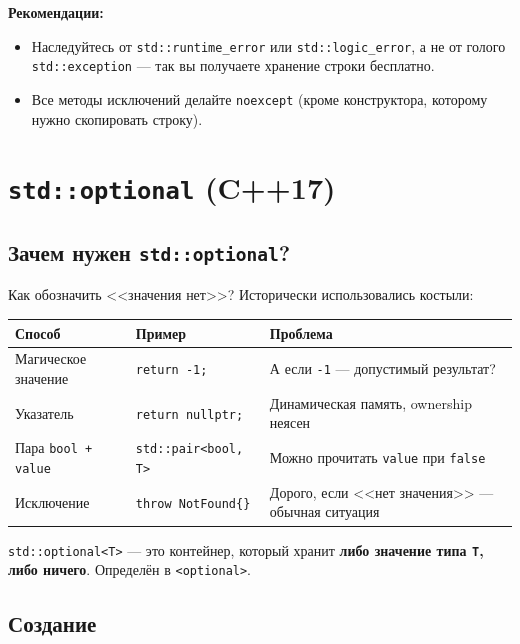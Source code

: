 \documentclass[a4paper,12pt]{article}
\begin{document}
\textbf{Рекомендации:}
\begin{itemize}
    \item Наследуйтесь от \texttt{std::runtime\_error} или \texttt{std::logic\_error},
          а не от голого \texttt{std::exception} --- так вы получаете хранение строки
          бесплатно.
    \item Все методы исключений делайте \texttt{noexcept} (кроме конструктора,
          которому нужно скопировать строку).
\end{itemize}

\newpage
\section{\texttt{std::optional} (C++17)}

\subsection{Зачем нужен \texttt{std::optional}?}

Как обозначить <<значения нет>>? Исторически использовались костыли:

\begin{center}
\begin{tabular}{lp{4cm}p{5cm}}
\toprule
\textbf{Способ} & \textbf{Пример} & \textbf{Проблема} \\
\midrule
Магическое значение
    & \texttt{return -1;}
    & А если \texttt{-1} --- допустимый результат? \\
\addlinespace
Указатель
    & \texttt{return nullptr;}
    & Динамическая память, ownership неясен \\
\addlinespace
Пара \texttt{bool + value}
    & \texttt{std::pair<bool, T>}
    & Можно прочитать \texttt{value} при \texttt{false} \\
\addlinespace
Исключение
    & \texttt{throw NotFound\{\}}
    & Дорого, если <<нет значения>> --- обычная ситуация \\
\bottomrule
\end{tabular}
\end{center}

\texttt{std::optional<T>} --- это контейнер, который хранит \textbf{либо значение
типа \texttt{T}, либо ничего}. Определён в \texttt{<optional>}.

\subsection{Создание}
\end{document}
